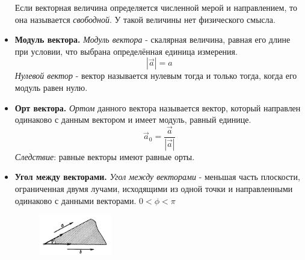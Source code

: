 \documentclass{article}
\begin{document}
\begin{itemize}
\begin{figure}[H]
    \end{figure}
  Если векторная величина определяется численной мерой и направлением, то она называется \textit{свободной}. У такой величины нет физического смысла.\\
  \item \textbf{Модуль вектора.} \textit{Модуль вектора} - скалярная величина, равная его длине при условии, что выбрана определённая единица измерения. $$|\vec{a}| = a$$
  \textit{Нулевой вектор} - вектор называется нулевым тогда и только тогда, когда его модуль равен нулю.
  \item \textbf{Орт вектора.} \textit{Ортом} данного вектора называется вектор, который направлен одинаково с данным вектором и имеет модуль, равный единице.
  $$\vec{a}_{0} = \frac{\vec{a}}{|\vec{a}|}$$
  \textit{Следствие}: равные векторы имеют равные орты.
  \item \textbf{Угол между векторами.} \textit{Угол между векторами} - меньшая часть плоскости, ограниченная двумя лучами, исходящими из одной точки и направленными одинаково с данными векторами. $0 < \phi < \pi$
    \begin{figure}[H]
        \centering
        \includegraphics[width=0.3\textwidth]{image1_1.png}
    \end{figure}
\end{itemize}
\end{document}
